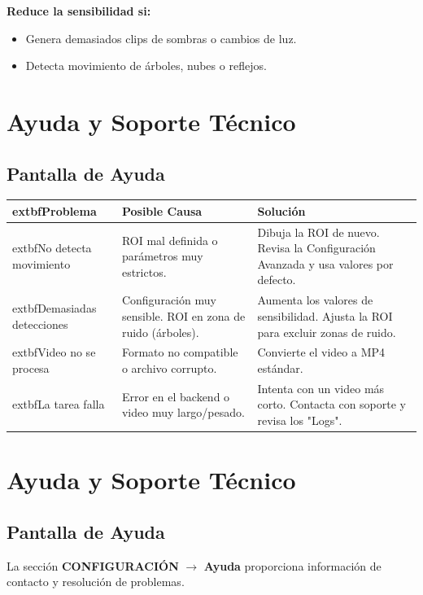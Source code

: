 \documentclass[11pt,a4paper]{article}
\begin{document}
\textbf{Reduce la sensibilidad si:}
\begin{itemize}
    \item Genera demasiados clips de sombras o cambios de luz.
    \item Detecta movimiento de árboles, nubes o reflejos.
\end{itemize}

\section{Ayuda y Soporte Técnico}

\subsection{Pantalla de Ayuda}

\begin{longtable}{|p{4cm}|p{5cm}|p{5cm}|}
\hline
	extbf{Problema} & \textbf{Posible Causa} & \textbf{Solución} \\ \hline
\endhead
	extbf{No detecta movimiento} & ROI mal definida o parámetros muy estrictos. & Dibuja la ROI de nuevo. Revisa la Configuración Avanzada y usa valores por defecto. \\ \hline
	extbf{Demasiadas detecciones} & Configuración muy sensible. ROI en zona de ruido (árboles). & Aumenta los valores de sensibilidad. Ajusta la ROI para excluir zonas de ruido. \\ \hline
	extbf{Video no se procesa} & Formato no compatible o archivo corrupto. & Convierte el video a MP4 estándar. \\ \hline
	extbf{La tarea falla} & Error en el backend o video muy largo/pesado. & Intenta con un video más corto. Contacta con soporte y revisa los "Logs". \\ \hline
\end{longtable}

\section{Ayuda y Soporte Técnico}

\subsection{Pantalla de Ayuda}

La sección \textbf{CONFIGURACIÓN} $\rightarrow$ \textbf{Ayuda} proporciona información de contacto y resolución de problemas.
\end{document}
